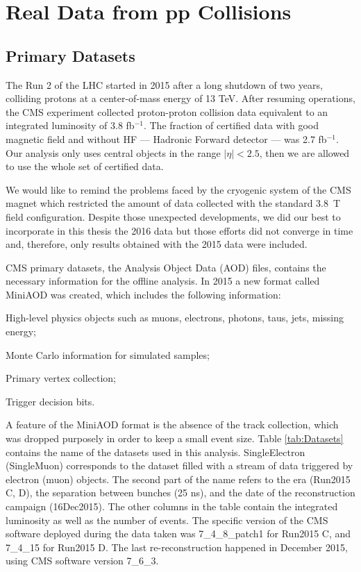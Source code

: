 \chapter{Real Data from pp Collisions}
\label{ch:realdata}

\section{Primary Datasets}
The Run 2 of the LHC started in 2015 after a long shutdown of two years, colliding protons at a center-of-mass energy of 13 TeV. After resuming operations, the CMS experiment collected proton-proton collision data equivalent to an integrated luminosity of 3.8 fb$^{-1}$. The fraction of certified data with good magnetic field and without HF --- Hadronic Forward detector --- was 2.7 fb$^{-1}$. %
Our analysis only uses central objects in the range $|\eta|<2.5$, then we are allowed to use the whole set of certified data.%

We would like to remind the problems faced by the cryogenic system of the CMS magnet which restricted the amount of data collected with the standard 3.8~T field configuration. Despite those unexpected developments, we did our best to incorporate in this thesis the 2016 data but those efforts did not converge in time and, therefore, only results obtained with the 2015 data were included.

CMS primary datasets, the Analysis Object Data (AOD) files, contains the necessary information for the offline analysis. In 2015 a new format called MiniAOD \cite{miniAODtwiki} was created, which includes the following information:
\begin{compact_itemize}
\item High-level physics objects such as muons, electrons, photons, taus, jets, missing energy;
\item Monte Carlo information for simulated samples;
\item Primary vertex collection;
\item Trigger decision bits.
\end{compact_itemize}

A feature of the MiniAOD format is the absence of the track collection, which was dropped purposely in order to keep a small event size. Table \ref{tab:Datasets} contains the name of the datasets used in this analysis.  SingleElectron (SingleMuon) corresponds to the dataset filled with a stream of data triggered by electron (muon) objects. The second part of the name refers to the era (Run2015 C, D), the separation between bunches (25 ns), and the date of the reconstruction campaign (16Dec2015). The other columns in the table contain the integrated luminosity as well as the number of events. The specific version of the CMS software deployed during the data taken was 7\_4\_8\_patch1 for Run2015 C, and 7\_4\_15 for Run2015 D. The last re-reconstruction happened in December 2015, using CMS software version 7\_6\_3.

